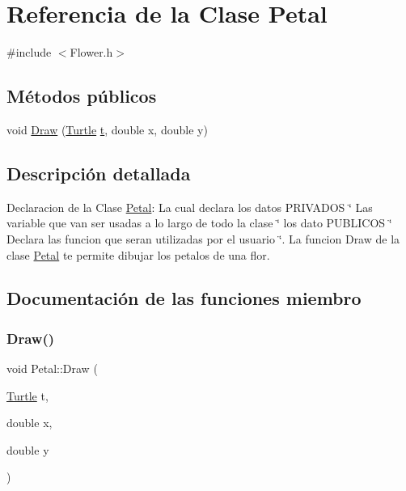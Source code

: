 \hypertarget{class_petal}{}\section{Referencia de la Clase Petal}
\label{class_petal}


{\ttfamily \#include $<$Flower.\+h$>$}

\subsection*{Métodos públicos}
\begin{DoxyCompactItemize}
\item 
void \mbox{\hyperlink{class_petal_aa11d943d04fc35af0b09d62ae1eb1c2f}{Draw}} (\mbox{\hyperlink{class_turtle}{Turtle}} \mbox{\hyperlink{_abstract_8cpp_a87833ae07d42f160626b6355cd9f8cf0}{t}}, double x, double y)
\end{DoxyCompactItemize}


\subsection{Descripción detallada}
Declaracion de la Clase \mbox{\hyperlink{class_petal}{Petal}}\+: La cual declara los datos P\+R\+I\+V\+A\+D\+OS \char`\"{} Las variable que van ser usadas a lo largo de todo la clase \char`\"{} los dato P\+U\+B\+L\+I\+C\+OS \char`\"{} Declara las funcion que seran utilizadas por el usuario \char`\"{}. La funcion Draw de la clase \mbox{\hyperlink{class_petal}{Petal}} te permite dibujar los petalos de una flor. 

\subsection{Documentación de las funciones miembro}
\mbox{\label{class_petal_aa11d943d04fc35af0b09d62ae1eb1c2f}} 
\subsubsection{\texorpdfstring{Draw()}{Draw()}}
{\footnotesize\ttfamily void Petal\+::\+Draw (\begin{DoxyParamCaption}\item[{\mbox{\hyperlink{class_turtle}{Turtle}}}]{t,  }\item[{double}]{x,  }\item[{double}]{y }\end{DoxyParamCaption})\hspace{0.3cm}{\ttfamily [inline]}}

